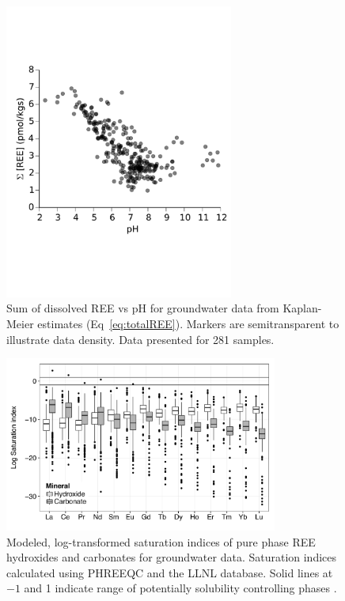 \begin{figure}[htbp]
\begin{center}
\includegraphics[width=0.67\textwidth]{Ch3_figures/tot_REE-vs-pH.pdf}
\caption{Sum of dissolved REE vs pH for groundwater data from Kaplan-Meier estimates (Eq~\ref{eq:totalREE}).
Markers are semitransparent to illustrate data density.
Data presented for 281 samples.}\label{fig:sum_vs_pH}
\end{center}
\end{figure}

\begin{figure}[htbp]
\begin{center}
\includegraphics[width=0.8\textwidth]{Ch3_figures/REE-mineral-SI.pdf}
\caption{Modeled, log-transformed saturation indices of pure phase REE hydroxides and carbonates for groundwater data. Saturation indices calculated using PHREEQC and the LLNL database. Solid lines at $-1$ and 1 indicate range of potentially solubility controlling phases \citep{Meima_EST_1997}.}\label{fig:REE_SI}
\end{center}
\end{figure}

